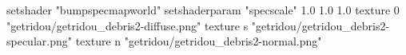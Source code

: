 setshader "bumpspecmapworld"
setshaderparam "specscale" 1.0 1.0 1.0
texture 0 "getridou/getridou_debris2-diffuse.png"
texture s "getridou/getridou_debris2-specular.png"
texture n "getridou/getridou_debris2-normal.png"